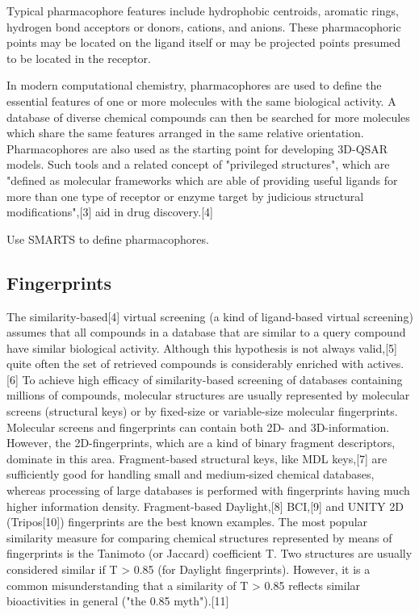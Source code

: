 Typical pharmacophore features include hydrophobic centroids, aromatic rings, hydrogen bond acceptors or donors, cations, and anions. These pharmacophoric points may be located on the ligand itself or may be projected points presumed to be located in the receptor.

In modern computational chemistry, pharmacophores are used to define the essential features of one or more molecules with the same biological activity. A database of diverse chemical compounds can then be searched for more molecules which share the same features arranged in the same relative orientation. Pharmacophores are also used as the starting point for developing 3D-QSAR models. Such tools and a related concept of "privileged structures", which are "defined as molecular frameworks which are able of providing useful ligands for more than one type of receptor or enzyme target by judicious structural modifications",[3] aid in drug discovery.[4]

Use SMARTS to define pharmacophores.

\subsection{Fingerprints} \label{subsec:fingerprints}

The similarity-based[4] virtual screening (a kind of ligand-based virtual screening) assumes that all compounds in a database that are similar to a query compound have similar biological activity. Although this hypothesis is not always valid,[5] quite often the set of retrieved compounds is considerably enriched with actives.[6] To achieve high efficacy of similarity-based screening of databases containing millions of compounds, molecular structures are usually represented by molecular screens (structural keys) or by fixed-size or variable-size molecular fingerprints. Molecular screens and fingerprints can contain both 2D- and 3D-information. However, the 2D-fingerprints, which are a kind of binary fragment descriptors, dominate in this area. Fragment-based structural keys, like MDL keys,[7] are sufficiently good for handling small and medium-sized chemical databases, whereas processing of large databases is performed with fingerprints having much higher information density. Fragment-based Daylight,[8] BCI,[9] and UNITY 2D (Tripos[10]) fingerprints are the best known examples. The most popular similarity measure for comparing chemical structures represented by means of fingerprints is the Tanimoto (or Jaccard) coefficient T. Two structures are usually considered similar if T > 0.85 (for Daylight fingerprints). However, it is a common misunderstanding that a similarity of T > 0.85 reflects similar bioactivities in general ("the 0.85 myth").[11]

